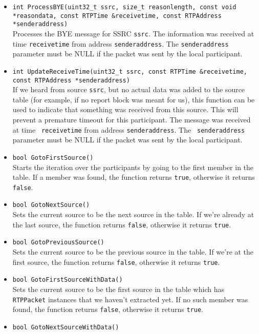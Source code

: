 \documentclass[12pt,a4paper]{article}
\begin{document}
\begin{itemize}
					\item {\tt int ProcessBYE(uint32\_t ssrc, size\_t reasonlength, const void *reasondata, const RTPTime \&receivetime,
					                          const RTPAddress *senderaddress)}\\
						Processes the BYE message for SSRC {\tt ssrc}. The
						information was received at time {\tt receivetime} from
						address {\tt senderaddress}. The {\tt senderaddress}
						parameter must be NULL if the packet was sent by the
						local participant.
					\item {\tt int UpdateReceiveTime(uint32\_t ssrc, const RTPTime \&receivetime, const RTPAddress *senderaddress)}\\
						If we heard from source {\tt ssrc}, but no actual
						data was added to the source table (for example, if
						no report block was meant for us), this function can
						be used to indicate that something was received from
						this source. This will prevent a premature timeout for
						this participant. The message was received at time {\tt
						receivetime} from address {\tt senderaddress}. The {\tt
						senderaddress} parameter must be NULL if the packet was
						sent by the local participant.
					\item {\tt bool GotoFirstSource()}\\
						Starts the iteration over the participants by going to the
						first member in the table. If a member was found, the function
						returns {\tt true}, otherwise it returns {\tt false}.
					\item {\tt bool GotoNextSource()}\\
						Sets the current source to be the next source in the table.
						If we're already at the last source, the function returns
						{\tt false}, otherwise it returns {\tt true}.
					\item {\tt bool GotoPreviousSource()}\\
						Sets the current source to be the previous source in the table.
						If we're at the first source, the function returns
						{\tt false}, otherwise it returns {\tt true}.
					\item {\tt bool GotoFirstSourceWithData()}\\
						Sets the current source to be the first source in the table
						which has {\tt RTPPacket} instances that we haven't extracted
						yet. If no such member was found, the function returns {\tt false},
						otherwise it returns {\tt true}.
					\item {\tt bool GotoNextSourceWithData()}\\

\end{itemize}
\end{document}
